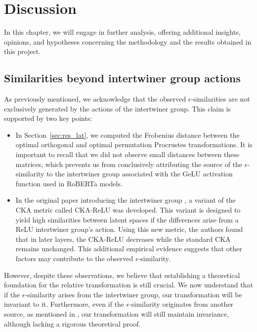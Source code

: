 \documentclass[../main.tex]{subfiles}
\begin{document}
\chapter{Discussion}
\label{ch:discussion}

In this chapter, we will engage in further analysis, offering additional insights, opinions, and hypotheses concerning the methodology and the results obtained in this project.

\section{Similarities beyond intertwiner group actions}
\label{sec:more_sim}

As previously mentioned, we acknowledge that the observed $\epsilon$-similarities are not exclusively generated by the actions of the intertwiner group. This claim is supported by two key points:
\begin{itemize}
    \item In Section~\ref{sec:res_lat}, we computed the Frobenius distance between the optimal orthogonal and optimal permutation Procrustes transformations. It is important to recall that we did not observe small distances between these matrices, which prevents us from conclusively attributing the source of the $\epsilon$-similarity to the intertwiner group associated with the GeLU activation function used in RoBERTa models.

     \item In the original paper introducing the intertwiner group \cite{godfrey_symmetries_2023}, a variant of the CKA metric called CKA-ReLU was developed. This variant is designed to yield high similarities between latent spaces if the differences arise from a ReLU intertwiner group's action. Using this new metric, the authors found that in later layers, the CKA-ReLU decreases while the standard CKA remains unchanged. This additional empirical evidence suggests that other factors may contribute to the observed $\epsilon$-similarity.
\end{itemize}

However, despite these observations, we believe that establishing a theoretical foundation for the relative transformation is still crucial. We now understand that if the $\epsilon$-similarity arises from the intertwiner group, our transformation will be invariant to it. Furthermore, even if the $\epsilon$-similarity originates from another source, as mentioned in \cite{moschella_relative_2022}, our transformation will still maintain invariance, although lacking a rigorous theoretical proof.
\end{document}
